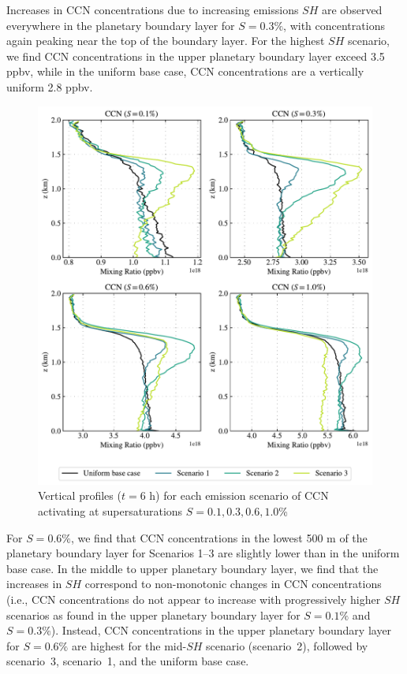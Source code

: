 Increases in CCN concentrations due to increasing emissions $SH$ are observed everywhere in the planetary boundary layer for $S=0.3\%$, with concentrations again peaking near the top of the boundary layer. For the highest $SH$ scenario, we find CCN concentrations in the upper planetary boundary layer exceed 3.5 ppbv, while in the uniform base case, CCN concentrations are a vertically uniform 2.8 ppbv. 

\begin{figure}[!t]
  \centering
    \includegraphics[width=.9\textwidth]{figures/chapter5/aerosol-ccn-vertical-profiles-time36.pdf}
    \caption{Vertical profiles ($t=6$ h) for each emission scenario of CCN activating at supersaturations $S=0.1, 0.3, 0.6, 1.0$\%}
    \label{fig:vertprof-ccn}
\end{figure}

For $S=0.6\%$, we find that CCN concentrations in the lowest 500 m of the planetary boundary layer for Scenarios 1--3 are slightly lower than in the uniform base case. In the middle to upper planetary boundary layer, we find that the increases in $SH$ correspond to non-monotonic changes in CCN concentrations (i.e., CCN concentrations do not appear to increase with progressively higher $SH$ scenarios as found in the upper planetary boundary layer for $S=0.1\%$ and $S=0.3\%$). Instead, CCN concentrations in the upper planetary boundary layer for $S=0.6\%$ are highest for the mid-$SH$ scenario (scenario~2), followed by scenario~3, scenario~1, and the uniform base case. 

